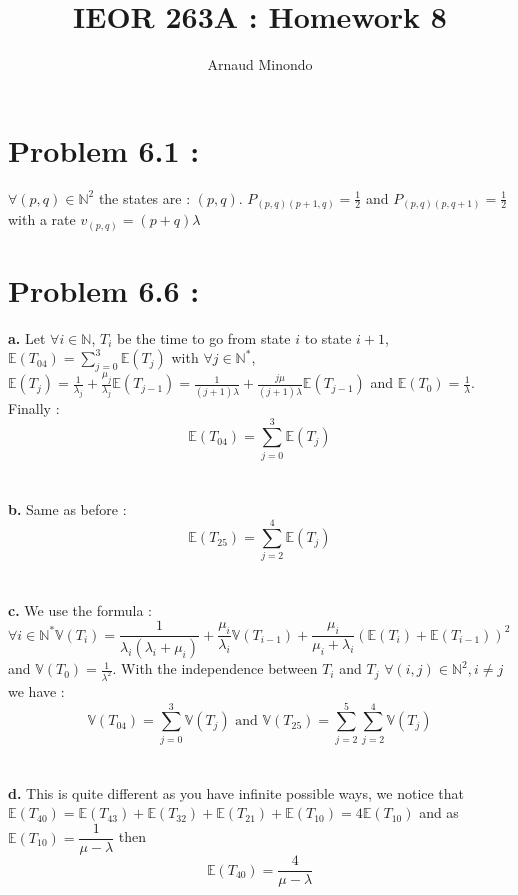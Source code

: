 \documentclass{article}
\title{IEOR 263A : Homework 8}
\author{Arnaud Minondo}
\begin{document}
\maketitle
\section*{Problem 6.1 :}
$\forall (p,q)\in\mathbb{N}^2$ the states are : $(p,q)$. $P_{(p,q)(p+1,q)} = \frac{1}{2}$ and $P_{(p,q)(p,q+1)} = \frac{1}{2}$ with a rate $v_{(p,q)} = (p+q)\lambda$
\section*{Problem 6.6 :}
\textbf{a.} Let $\forall i \in \mathbb{N}$, $T_i$ be the time to go from state $i$ to state $i+1$, $\mathbb{E}(T_{04}) = \sum\limits_{j=0}^3\mathbb{E}(T_{j})$ with $\forall j\in\mathbb{N}^*$, $\mathbb{E}(T_j) = \frac{1}{\lambda_j}+\frac{\mu_j}{\lambda_j}\mathbb{E}(T_{j-1}) = \frac{1}{(j+1)\lambda}+\frac{j\mu}{(j+1)\lambda}\mathbb{E}(T_{j-1})$ and $\mathbb{E}(T_0) = \frac{1}{\lambda}$.
Finally : $$\boxed{\mathbb{E}(T_{04}) = \sum\limits_{j=0}^3\mathbb{E}(T_{j})}$$
\\\\
\textbf{b.} Same as before : 
$$\boxed{\mathbb{E}(T_{25}) = \sum_{j=2}^4\mathbb{E}(T_j)}$$
\\\\
\textbf{c.} We use the formula : $\forall i\in\mathbb{N}^*\mathbb{V}(T_i) = \dfrac{1}{\lambda_i(\lambda_i+\mu_i)}+\dfrac{\mu_i}{\lambda_i}\mathbb{V}(T_{i-1})+\dfrac{\mu_i}{\mu_i+\lambda_i}(\mathbb{E}(T_i)+\mathbb{E}(T_{i-1}))^2$ and $\mathbb{V}(T_0) = \frac{1}{\lambda^2}$. With the independence between $T_i$ and $T_j$ $\forall(i,j)\in\mathbb{N}^2, i\neq j$ we have : $$\boxed{\mathbb{V}(T_{04}) = \sum_{j=0}^3\mathbb{V}(T_j) \text{ and }\mathbb{V}(T_{25}) = \sum_{j=2}^5\sum_{j=2}^4\mathbb{V}(T_j)}$$
\\\\
\textbf{d.} This is quite different as you have infinite possible ways, we notice that $\mathbb{E}(T_{40}) = \mathbb{E}(T_{43})+\mathbb{E}(T_{32})+\mathbb{E}(T_{21})+\mathbb{E}(T_{10})=4\mathbb{E}(T_{10})$ and as $\mathbb{E}(T_{10}) = \dfrac{1}{\mu-\lambda}$ then $$\boxed{\mathbb{E}(T_{40}) = \dfrac{4}{\mu-\lambda}}$$
\end{document}
